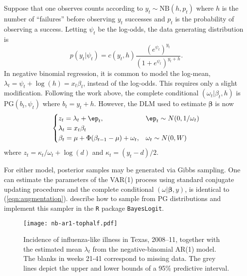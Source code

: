 \documentclass[11pt]{article}
\newcommand{\PG}{\text{PG}}
\newcommand{\NB}{\text{NB}}
\newcommand{\bbeta}{\boldsymbol{\beta}}
\begin{document}
\begin{example}
Suppose that one observes counts according to $y_t \sim \NB(h, p_t)$ where $h$
is the number of ``failures'' before observing $y_t$ successes and $p_t$ is the
probability of observing a success.  Letting $\psi_t$ be the log-odds, the data
generating distribution is
\[
p(y_t | \psi_t) = c(y_t, h) \frac{(e^{\psi_t})^{y_t}}{(1+e^{\psi_t})^{y_t+h}}.
\]
In negative binomial regression, it is common to model the log-mean, $\lambda_t
= \psi_t + \log(h) = x_t \beta_t$, instead of the log-odds.  This requires only
a slight modification.  Following the work above, the complete conditional
$(\omega_t | \beta_t, h)$ is $\PG(b_t, \psi_t)$ where $b_t = y_t + h$.  However,
the DLM used to estimate $\bbeta$ is now
\[
\begin{cases}
z_t = \lambda_t + \ep_t, & \ep_t \sim N(0, 1/\omega_t) \\
\lambda_t = x_t \beta_t \\
\beta_t = \mu + \Phi (\beta_{t-1} - \mu) + \omega_t, & \omega_t \sim N(0, W)
\end{cases}
\]
where $z_t = \kappa_t / \omega_t + \log(d)$ and $\kappa_t = (y_t - d) / 2$.
\end{example}

For either model, posterior samples may be generated via Gibbs sampling.  One
can estimate the parameters of the VAR(1) process using standard conjugate
updating procedures and the complete conditional $(\omega | \bbeta, y)$, is
identical to (\ref{eqn:augmentation}).  \cite{polson-etal-2012} describe how to
sample from $\PG$ distributions and implement this sampler in the \texttt{R}
package \texttt{BayesLogit}.  



\begin{figure}
\begin{center}
\texttt{[image: nb-ar1-tophalf.pdf]}
\caption{\label{fig:nb-ar1} Incidence of influenza-like illness in Texas,
  2008--11, together with the estimated mean $\lambda_t$ from the
  negative-binomial AR(1) model.  The blanks in weeks 21-41 correspond to
  missing data.  The grey lines depict the upper and lower bounds of a 95$\%$
  predictive interval.}
\end{center}
\end{figure}
\end{document}
